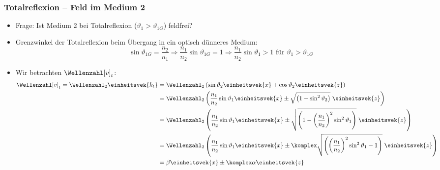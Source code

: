 \begin{frame}
  \frametitle{Totalreflexion -- Feld im Medium 2}  
  \begin{itemize}[<+->]
       \item Frage: Ist Medium 2 bei Totalreflexion (\(\vartheta_1> \vartheta_{1G}\)) feldfrei? 
  \item \alert{Grenzwinkel der Totalreflexion} beim \alert{Übergang in ein optisch dünneres Medium}:
         \begin{equation*}
           \sin\vartheta_{1G} = \frac{n_2}{n_1} \Rightarrow \frac{n_1}{n_2}\sin\vartheta_{1G} = 1 \Rightarrow \boxed{\frac{n_1}{n_2}\sin\vartheta_{1} > 1 \text{ für } \vartheta_{1}>\vartheta_{1G}}
         \end{equation*}
       \item Wir betrachten \(\Wellenzahl[v]_t\):
         \begin{align*}
           \Wellenzahl[v]_t=\Wellenzahl_2 \einheitsvek{k_t} &= \Wellenzahl_2 \left( \sin\vartheta_2\einheitsvek{x} +   \cos\vartheta_2\einheitsvek{z}\right) \\
                                                        &= \Wellenzahl_2 \left(\frac{n_1}{n_2} \sin\vartheta_1\einheitsvek{x} \pm \sqrt{\left(1-   \sin^2\vartheta_2\right)}\;\einheitsvek{z}\right)\\
                                                        &= \Wellenzahl_2 \left(\frac{n_1}{n_2} \sin\vartheta_1\einheitsvek{x} \pm \sqrt{\left(1-  \left(\frac{n_1}{n_2}\right)^2 \sin^2\vartheta_1\right)}\;\einheitsvek{z}\right)\\
                                                        &= \Wellenzahl_2 \left(\frac{n_1}{n_2} \sin\vartheta_1\einheitsvek{x} \pm \komplex\sqrt{\left( \left(\frac{n_1}{n_2}\right)^2 \sin^2\vartheta_1-1\right)}\;\einheitsvek{z}\right)\\
           &= \beta \einheitsvek{x} \pm \komplex \alpha \einheitsvek{z} 
           \end{align*}
\end{itemize}
\end{frame}

